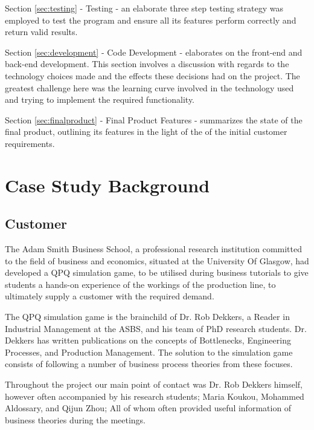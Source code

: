 \documentclass{l3proj}
\begin{document}
Section \ref{sec:testing} - Testing - an elaborate three step testing strategy was employed to test the program and ensure all its features perform correctly and return valid results.

Section \ref{sec:development} - Code Development - elaborates on the front-end and back-end development. This section involves a discussion with regards to the technology choices made and the effects these decisions had on the project. The greatest challenge here was the learning curve involved in the technology used and trying to implement the required functionality.

Section \ref{sec:finalproduct} - Final Product Features - summarizes the state of the final product, outlining its features in the light of the of the initial customer requirements.

\section{Case Study Background}
\label{sec:casestudy}

\subsection{Customer}

The Adam Smith Business School, a professional research institution committed to the field of business and economics, situated at the University Of Glasgow, had developed a QPQ simulation game, to be utilised during business tutorials to give students a hands-on experience of the workings of the production line, to ultimately supply a customer with the required demand.

The QPQ simulation game is the brainchild of Dr. Rob Dekkers, a Reader in Industrial Management at the ASBS, and his team of PhD research students. Dr. Dekkers has written publications on the concepts of Bottlenecks, Engineering Processes, and Production Management. The solution to the simulation game consists of following a number of business process theories from these focuses.

Throughout the project our main point of contact was Dr. Rob Dekkers himself, however often accompanied by his research students; Maria Koukou, Mohammed Aldossary, and Qijun Zhou; All of whom often provided useful information of business theories during the meetings.
\end{document}
